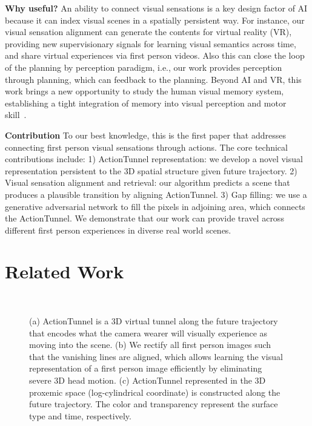 \documentclass[10pt,twocolumn,letterpaper]{article}
\begin{document}
\noindent\textbf{Why useful?} An ability to connect visual sensations is a key design factor of AI because it can index visual scenes in a spatially persistent way. For instance, our visual sensation alignment can generate the contents for virtual reality (VR), providing new supervisionary signals for learning visual semantics across time, and share virtual experiences via first person videos. Also this can close the loop of the planning by perception paradigm, i.e., our work provides perception through planning, which can feedback to the planning. Beyond AI and VR, this work brings a new opportunity to study the human visual memory system, establishing a tight integration of memory into visual perception and motor skill~\cite{wolpert:2011}.


\noindent\textbf{Contribution} To our best knowledge, this is the first paper that addresses connecting first person visual sensations through actions. The core technical contributions include: 1) ActionTunnel representation: we develop a novel visual representation persistent to the 3D spatial structure given future trajectory. 2) Visual sensation alignment and retrieval: our algorithm predicts a scene that produces a plausible transition by aligning ActionTunnel. 3) Gap filling: we use a generative adversarial network to fill the pixels in adjoining area, which connects the ActionTunnel. We demonstrate that our work can provide travel across different first person experiences in diverse real world scenes.


\section{Related Work}

\begin{figure*}[th]
  \centering  
      ~
      ~
      ~~
  \caption{(a) ActionTunnel is a 3D virtual tunnel along the future trajectory that encodes what the camera wearer will visually experience as moving into the scene. (b) We rectify all first person images such that the vanishing lines are aligned, which allows learning the visual representation of a first person image efficiently by eliminating severe 3D head motion. (c) ActionTunnel represented in the 3D proxemic space (log-cylindrical coordinate) is constructed along the future trajectory. The color and transparency represent the surface type and time, respectively.} 
  \label{Fig:action11}
\end{figure*}
\end{document}
